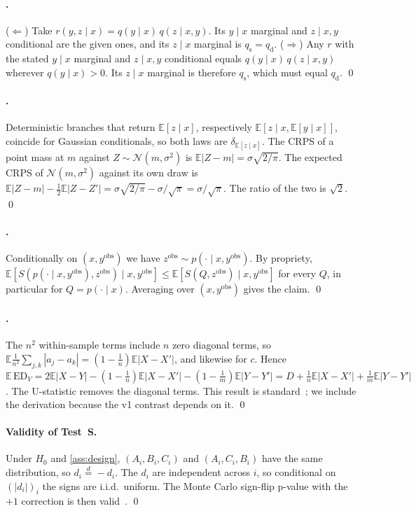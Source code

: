 \documentclass{article}
\theoremstyle{plain}
\theoremstyle{definition}
\theoremstyle{remark}
\newcommand{\ED}{\mathrm{ED}}
\newcommand{\E}{\mathbb{E}}
\newcommand{\qd}{q_{\mathrm{d}}}
\newcommand{\qs}{q_{\mathrm{s}}}
\begin{document}
\paragraph{.}
($\Leftarrow$) Take $r(y,z\mid x)=q(y\mid x)\,q(z\mid x,y)$. Its $y\mid x$ marginal and $z\mid x,y$ conditional are the given ones, and its $z\mid x$ marginal is $\qs=\qd$.
($\Rightarrow$) Any $r$ with the stated $y\mid x$ marginal and $z\mid x,y$ conditional equals $q(y\mid x)\,q(z\mid x,y)$ wherever $q(y\mid x)>0$. Its $z\mid x$ marginal is therefore $\qs$, which must equal $\qd$. \qed

\paragraph{.}
Deterministic branches that return $\E[z\mid x]$, respectively $\E[z\mid x,\E[y\mid x]]$, coincide for Gaussian conditionals, so both laws are $\delta_{\E[z\mid x]}$.
The CRPS of a point mass at $m$ against $Z\sim\mathcal N(m,\sigma^2)$ is $\E|Z-m|=\sigma\sqrt{2/\pi}$.
The expected CRPS of $\mathcal N(m,\sigma^2)$ against its own draw is $\E|Z-m|-\tfrac12\E|Z-Z'|=\sigma\sqrt{2/\pi}-\sigma/\sqrt{\pi}=\sigma/\sqrt\pi$. The ratio of the two is $\sqrt2$. \qed

\paragraph{.}
Conditionally on $(x,y^{\mathrm{obs}})$ we have $z^{\mathrm{obs}}\sim p(\cdot\mid x,y^{\mathrm{obs}})$. By propriety, $\E[S(p(\cdot\mid x,y^{\mathrm{obs}}),z^{\mathrm{obs}})\mid x,y^{\mathrm{obs}}]\le\E[S(Q,z^{\mathrm{obs}})\mid x,y^{\mathrm{obs}}]$ for every $Q$, in particular for $Q=p(\cdot\mid x)$. Averaging over $(x,y^{\mathrm{obs}})$ gives the claim. \qed

\paragraph{.}
The $n^2$ within-sample terms include $n$ zero diagonal terms, so $\E\frac{1}{n^2}\sum_{j,k}|a_j-a_k|=(1-\frac1n)\E|X-X'|$, and likewise for $c$. Hence $\E\,\ED_V=2\E|X-Y|-(1-\frac1n)\E|X-X'|-(1-\frac1m)\E|Y-Y'|=D+\frac1n\E|X-X'|+\frac1m\E|Y-Y'|$. The U-statistic removes the diagonal terms. This result is standard~\citep{szekely2013energy}; we include the derivation because the v1 contrast depends on it. \qed

\paragraph{Validity of Test~S.}
Under $H_0$ and \cref{ass:design}, $(A_i,B_i,C_i)$ and $(A_i,C_i,B_i)$ have the same distribution, so $d_i\overset{d}{=}-d_i$. The $d_i$ are independent across $i$, so conditional on $(|d_i|)_i$ the signs are i.i.d.\ uniform. The Monte Carlo sign-flip p-value with the $+1$ correction is then valid~\citep{phipson2010permutation}. \qed
\end{document}
